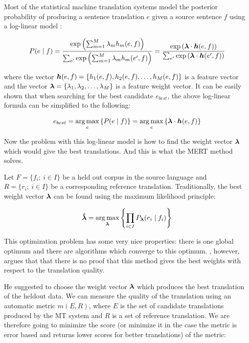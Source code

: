 Most of the statistical machine translation systems model the posterior
probability of producing a sentence translation $e$ given a source sentence $f$
using a log-linear model : 

\begin{equation}
    P(e \mid f) = %
    \frac
        {\exp \left(\sum_{m=1}^M \lambda_m h_m(e,f) \right)}
        {\sum_{e'} \exp \left(\sum_{m=1}^M \lambda_m h_m(e',f)\right)}
    = \frac
    {\exp \left( \vect{\lambda} \cdot \vect{h}(e,f)  \right)}
    {\sum_{e'} \exp \left(\vect{\lambda} \cdot \vect{h}(e',f)\right)}
\end{equation}

\noindent where the vector $\boldsymbol{h}(e,f) = \{ h_1(e,f), h_2(e,f), \ldots ,
h_M(e,f) \}$ is a feature vector and the vector $\boldsymbol{\lambda} = \{\lambda_1,
\lambda_2, \ldots, \lambda_M \}$ is a feature weight vector. It can be easily
shown that when searching for the best candidate $e_{best}$, the above
log-linear formula can be simplified to the following:

\begin{equation}
  e_{best}  =  \operatorname*{arg\,max}_e \left\{ P(e \mid f) \right\}
  =  \operatorname*{arg\,max}_e \left\{ \boldsymbol{\lambda} \cdot \boldsymbol{h}(e,f) \right\}
\end{equation}

Now the problem with this log-linear model is how to find the weight vector
$\boldsymbol{\lambda}$ which would give the best translations. And this is what the
MERT method solves.

Let $F = \{f_i;~ i \in I\}$ be a held out corpus in the source language and $R
= \{r_i;~ i \in I\}$ be a corresponding reference translation. Traditionally,
the best weight vector $\boldsymbol{\lambda}$ can be found using the maximum
likelihood principle:

\begin{equation}
  \boldsymbol{\hat\lambda} = \operatorname*{arg\,max}_{\boldsymbol{\lambda}} \left\{ \prod_{i \in I}
  P_{\boldsymbol{\lambda}} (e_i \mid f_i ) 
\right\}
\end{equation}

\noindent This optimization problem has some very nice properties: there is
one global optimum and there are algorithms which converge to this optimum.
, however, argues that that there is no proof that this
method gives the best weights with respect to the translation quality. 

He suggested to choose the weight vector $\boldsymbol{\lambda}$ which produces the
best translation of the heldout data. We can measure the quality of the
translation using an automatic metric $m(E,R)$, where $E$ is the set of
candidate translations produced by the MT system and $R$ is a set of reference
translation. We are therefore going to minimize the score (or minimize it in
the case the metric is error based and returns lower scores for better
translations) of the metric:

